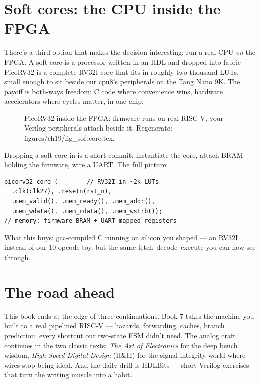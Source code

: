 \section{Soft cores: the CPU inside the FPGA}\label{sec:softcore19}

There's a third option that makes the decision interesting: run a
real CPU \emph{on} the FPGA. A soft core is a processor written
in an HDL and dropped into fabric --- PicoRV32 is a complete
RV32I core that fits in roughly two thousand LUTs, small enough to
sit beside our cpu8's peripherals on the Tang Nano 9K. The payoff
is both-ways freedom: C code where convenience wins, hardware
accelerators where cycles matter, in one chip.

\begin{figure}[htbp]
\centering

\caption{PicoRV32 inside the FPGA: firmware runs on real RISC-V,
your Verilog peripherals attach beside it. Regenerate: \ttfamily
figures/ch19/fig\_softcore.tex.}
\label{fig:softcore19}
\end{figure}

\begin{example}
Dropping a soft core in is a short commit: instantiate the core,
attach BRAM holding the firmware, wire a UART. The full picture:

\begin{lstlisting}[caption={The soft-core shape (shown; a real
PicoRV32 build is Book 7's material --- its repo is cited).}]
picorv32 core (        // RV32I in ~2k LUTs
  .clk(clk27), .resetn(rst_n),
  .mem_valid(), .mem_ready(), .mem_addr(),
  .mem_wdata(), .mem_rdata(), .mem_wstrb());
// memory: firmware BRAM + UART-mapped registers
\end{lstlisting}

What this buys: gcc-compiled C running on silicon you shaped ---
an RV32I instead of our 10-opcode toy, but the same
fetch--decode--execute you can now see through.
\end{example}

\section{The road ahead}\label{sec:road19}

This book ends at the edge of three continuations. Book 7 takes
the machine you built to a real pipelined RISC-V --- hazards,
forwarding, caches, branch prediction: every shortcut our
two-state FSM didn't need. The analog craft continues in the
two classic texts: \emph{The Art of Electronics} for the deep
bench wisdom, \emph{High-Speed Digital Design} (H\&H) for the
signal-integrity world where wires stop being ideal. And the
daily drill is HDLBits --- short Verilog exercises that turn the
writing muscle into a habit.

